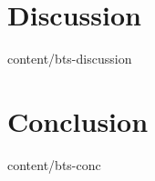 \documentclass{btswhitepaper}
\begin{document}
\section       { Discussion                        }  { content/bts-discussion      } 

\section       { Conclusion                        }  { content/bts-conc            } 




\end{document}

